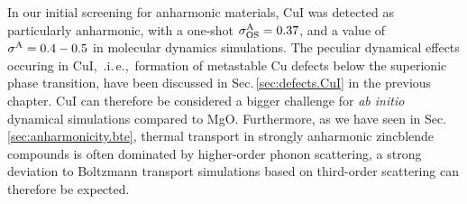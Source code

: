 In our initial screening for anharmonic materials, CuI was detected as particularly anharmonic, with a one-shot $\sigma^\mathrm{A}_\mathrm{OS} = 0.37$, 
and a value of $\sigma^\mathrm{A} = 0.4-0.5$ in molecular dynamics simulations. The peculiar dynamical effects occuring in CuI,~.i.\,e.,~formation of metastable Cu defects below the superionic phase transition, have been discussed in Sec.\,\ref{sec:defects.CuI} in the previous chapter. CuI can therefore be considered a bigger challenge for \emph{ab initio} dynamical simulations compared to MgO.
Furthermore, as we have seen in Sec.\,\ref{sec:anharmonicity.bte}, thermal transport in strongly anharmonic zincblende compounds is often dominated by higher-order phonon scattering, a strong deviation to Boltzmann transport simulations based on third-order scattering can therefore be expected.



